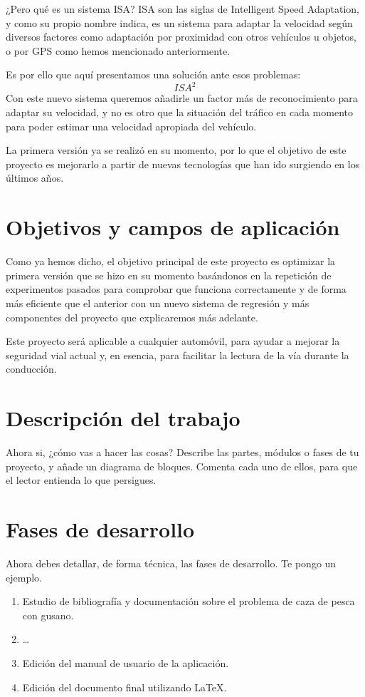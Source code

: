 \documentclass[12pt,oneside,a4paper]{article}
\begin{document}
¿Pero qué es un sistema ISA? ISA son las siglas de Intelligent Speed Adaptation, y como su propio nombre indica, es un sistema para adaptar la velocidad según diversos factores como adaptación por proximidad con otros vehículos u objetos, o por GPS como hemos mencionado anteriormente.

Es por ello que aquí presentamos una solución ante esos problemas: \[ISA^{2}\]
Con este nuevo sistema queremos añadirle un factor más de reconocimiento para adaptar su velocidad, y no es otro que la situación del tráfico en cada momento para poder estimar una velocidad apropiada del vehículo.

La primera versión ya se realizó en su momento, por lo que el objetivo de este proyecto es mejorarlo a partir de nuevas tecnologías que han ido surgiendo en los últimos años.

\section{Objetivos y campos de aplicación}

Como ya hemos dicho, el objetivo principal de este proyecto es optimizar la primera versión que se hizo en su momento basándonos en la repetición de experimentos pasados para comprobar que funciona correctamente y de forma más eficiente que el anterior con un nuevo sistema de regresión y más componentes del proyecto que explicaremos más adelante.

Este proyecto será aplicable a cualquier automóvil, para ayudar a mejorar la seguridad vial actual y, en esencia, para facilitar la lectura de la vía durante la conducción.

\section{Descripción del trabajo}


Ahora si, ¿cómo vas a hacer las cosas? Describe las partes, módulos o fases de tu proyecto, y añade un diagrama de bloques. Comenta cada uno de ellos, para que el lector entienda lo que persigues.

\section{Fases de desarrollo}
Ahora debes detallar, de forma técnica, las fases de desarrollo. Te pongo un ejemplo.

\begin{enumerate}
\item Estudio de bibliografía y documentación sobre el problema de caza de pesca con gusano.
\item \ldots
\item Edición del manual de usuario de la aplicación.
\item Edición del documento final utilizando \LaTeX.
\end{enumerate}
\end{document}
